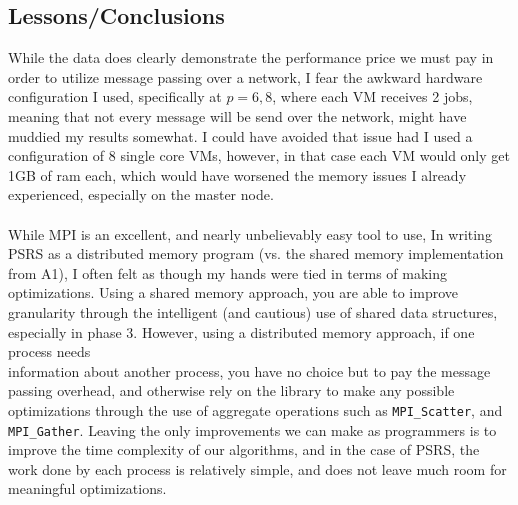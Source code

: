 \documentclass[11pt]{report}
\begin{document}
\subsection*{Lessons/Conclusions}
While the data does clearly demonstrate the performance price we must pay in order to utilize message
passing over a network, I fear the awkward hardware configuration I used, specifically at $p=6,8$, where each VM receives 2 jobs, meaning that not every message will be send over the network, might have muddied
my results somewhat. I could have avoided that issue had I used a configuration of 8 single core VMs, however, in that case each VM would only get 1GB of ram each, which would have worsened the memory issues
I already experienced, especially on the master node.\\\\
While MPI is an excellent, and nearly unbelievably easy tool to use, In writing PSRS as a distributed memory program (vs. the shared memory implementation from A1), I often felt as though my hands were tied in terms of making optimizations. Using a shared memory approach, you are able to improve granularity through the intelligent (and cautious) use of shared data structures, especially in phase 3. However, using a distributed memory approach, if one process needs\\ information about another process, you have no choice but to pay the message passing overhead, and otherwise rely on the library to make any possible optimizations through the use of aggregate operations such as \verb|MPI_Scatter|, and \verb|MPI_Gather|. Leaving the only improvements we can make as programmers is to improve the time complexity of our algorithms, and in the case of PSRS, the work done by each process is relatively simple, and does not leave much room for meaningful optimizations.
\end{document}
